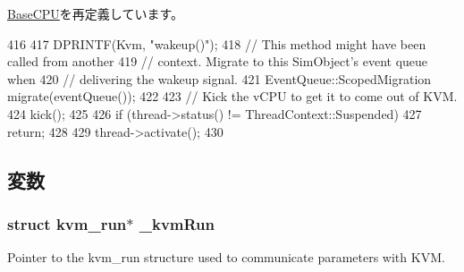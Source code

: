 \hyperlink{classBaseCPU_a75101f8aee74078c8c3c1d1f3617f7cc}{BaseCPU}を再定義しています。


\begin{DoxyCode}
416 {
417     DPRINTF(Kvm, "wakeup()\n");
418     // This method might have been called from another
419     // context. Migrate to this SimObject's event queue when
420     // delivering the wakeup signal.
421     EventQueue::ScopedMigration migrate(eventQueue());
422 
423     // Kick the vCPU to get it to come out of KVM.
424     kick();
425 
426     if (thread->status() != ThreadContext::Suspended)
427         return;
428 
429     thread->activate();
430 }
\end{DoxyCode}


\subsection{変数}
\hypertarget{classBaseKvmCPU_ab174cc060c981cfd21406dc3797c8c6b}{
\subsubsection[{\_\-kvmRun}]{\setlength{\rightskip}{0pt plus 5cm}struct kvm\_\-run$\ast$ {\bf \_\-kvmRun}}}
\label{classBaseKvmCPU_ab174cc060c981cfd21406dc3797c8c6b}
Pointer to the kvm\_\-run structure used to communicate parameters with KVM.

